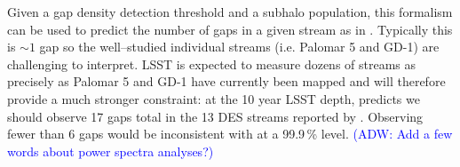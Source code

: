 \documentclass[modern,linenumbers]{aastex62}
\newcommand{\Comment}[3]{\textcolor{#1}{(#2: #3)}}
\newcommand{\ADW}[1]{\Comment{blue}{ADW}{#1}} %
\newcommand{\EON}[1]{\Comment{purple}{EON}{#1}} %
\newcommand{\DAH}[1]{\Comment{blue}{DH}{#1}} %
\begin{document}
Given a gap density detection threshold and a subhalo population, this formalism can be used to predict the number of gaps in a given stream as in \citet{erkal2016}. Typically this is $\sim 1$ gap  so the well--studied individual streams (i.e. Palomar 5 and GD-1) are challenging to interpret. LSST is expected to measure dozens of streams as precisely as Palomar 5 and GD-1 have currently been mapped and will therefore provide a much stronger constraint: at the 10 year LSST depth, \LCDM predicts we should observe 17 gaps total in the 13 DES streams reported by \cite{2018ApJ...862..114S}. Observing fewer than 6 gaps would be inconsistent with \LCDM at a 99.9\,\% level. \ADW{Add a few words about power spectra analyses?}




\end{document}

